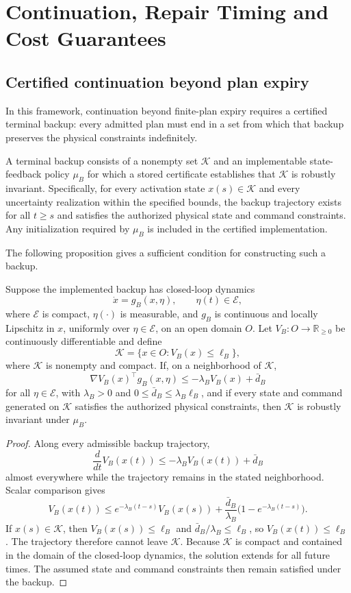 \section{Continuation, Repair Timing and Cost Guarantees}
\label{app:repair-cost}

\subsection{Certified continuation beyond plan expiry}
\label{sec:terminal-backup}

In this framework, continuation beyond finite-plan expiry requires a
certified terminal backup: every admitted plan must end in a set from which that backup
preserves the physical constraints indefinitely.

A terminal backup consists of a nonempty set $\mathcal K$ and an implementable
state-feedback policy $\mu_B$ for which a stored certificate establishes that
$\mathcal K$ is robustly invariant. Specifically, for every activation state
$x(s)\in\mathcal K$ and every uncertainty realization within the specified
bounds, the backup trajectory exists for all $t\ge s$ and satisfies the
authorized physical state and command constraints. Any initialization required by $\mu_B$ is included in the certified
implementation.

The following proposition gives a sufficient condition for constructing such
a backup.

\begin{proposition}
\label{prop:backup-lyapunov}
Suppose the implemented backup has closed-loop dynamics
\[
\dot x=g_B(x,\eta),\qquad \eta(t)\in\mathcal E,
\]
where $\mathcal E$ is compact, $\eta(\cdot)$ is measurable, and $g_B$ is
continuous and locally Lipschitz in $x$, uniformly over
$\eta\in\mathcal E$, on an open domain $O$. Let
$V_B:O\rightarrow\mathbb R_{\ge0}$ be continuously differentiable and define
\[
\mathcal K=\{x\in O:V_B(x)\le\ell_B\},
\]
where $\mathcal K$ is nonempty and compact. If, on a neighborhood of
$\mathcal K$,
\[
\nabla V_B(x)^\top g_B(x,\eta)
\le -\lambda_B V_B(x)+\bar d_B
\]
for all $\eta\in\mathcal E$, with
$\lambda_B>0$ and
$0\le\bar d_B\le\lambda_B\ell_B$, and if every state and command generated
on $\mathcal K$ satisfies the authorized physical constraints, then
$\mathcal K$ is robustly invariant under $\mu_B$.
\end{proposition}

\begin{proof}
Along every admissible backup trajectory,
\[
\frac{d}{dt}V_B(x(t))
\le -\lambda_B V_B(x(t))+\bar d_B
\]
almost everywhere while the trajectory remains in the stated neighborhood.
Scalar comparison gives
\[
V_B(x(t))
\le
e^{-\lambda_B(t-s)}V_B(x(s))
+
\frac{\bar d_B}{\lambda_B}
\bigl(1-e^{-\lambda_B(t-s)}\bigr).
\]
If $x(s)\in\mathcal K$, then
$V_B(x(s))\le\ell_B$ and
$\bar d_B/\lambda_B\le\ell_B$, so
$V_B(x(t))\le\ell_B$. The trajectory therefore cannot leave
$\mathcal K$. Because $\mathcal K$ is compact and contained in the domain of
the closed-loop dynamics, the solution extends for all future times. The
assumed state and command constraints then remain satisfied under the backup.
\end{proof}

